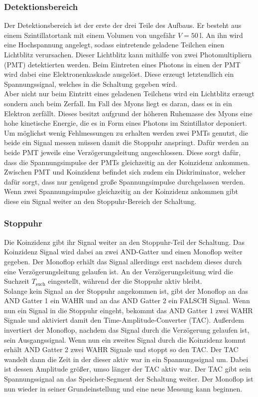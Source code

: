 \subsubsection{Detektionsbereich}
Der Detektionsbereich ist der erste der drei Teile des Aufbaus.
Er besteht aus einem Szintillatortank mit einem Volumen von ungefähr $V = \SI{50}{\litre}$.
An ihn wird eine Hochspannung angelegt, sodass eintretende geladene Teilchen einen Lichtblitz verursachen.
Dieser Lichtblitz kann mithilfe von zwei Photomultipliern (PMT) detektierten werden.
Beim Eintreten eines Photons in einen der PMT wird dabei eine Elektronenkaskade ausgelöst.
Diese erzeugt letztendlich ein Spannungssignal, welches in die Schaltung gegeben wird.\\
Aber nicht nur beim Eintritt eines geladenen Teilchens wird ein Lichtblitz erzeugt sondern auch beim Zerfall.
Im Fall des Myons liegt es daran, dass es in ein Elektron zerfällt.
Dieses besitzt aufgrund der höheren Ruhemasse des Myons eine hohe kinetische Energie, die es in Form eines Photons im Szintillator deponiert.\\
Um möglichst wenig Fehlmessungen zu erhalten werden zwei PMTs genutzt, die beide ein Signal messen müssen damit die Stoppuhr anspringt.
Dafür werden an beide PMT jeweils eine Verzögerungsleitung angeschlossen.
Diese sorgt dafür, dass die Spannungsimpulse der PMTs gleichzeitig an der Koinzidenz ankommen.
Zwischen PMT und Koinzidenz befindet sich zudem ein Diskriminator, welcher dafür sorgt, dass nur genügend große Spannungsimpulse durchgelassen werden.
Wenn zwei Spannungsimpulse gleichzeitig an der Koinzidenz ankommen gibt diese ein Signal weiter an den Stoppuhr-Bereich der Schaltung.
\subsubsection{Stoppuhr}
Die Koinzidenz gibt ihr Signal weiter an den Stoppuhr-Teil der Schaltung.
Das Koinzidenz Signal wird dabei an zwei AND-Gatter und einen Monoflop weiter gegeben.
Der Monoflop erhält das Signal allerdings erst nachdem dieses durch eine Verzögerungsleitung gelaufen ist.
An der Verzögerungsleitung wird die Suchzeit $T_\text{such}$ eingestellt, während der die Stoppuhr aktiv bleibt.\\
Solange kein Signal an der Stoppuhr angekommen ist, gibt der Monoflop an das AND Gatter 1 ein WAHR und an das AND Gatter 2 ein FALSCH Signal.
Wenn nun ein Signal in die Stoppuhr eingeht, bekommt das AND Gatter 1 zwei WAHR Signale und aktiviert damit den Time-Amplitude-Converter (TAC).
Außerdem invertiert der Monoflop, nachdem das Signal durch die Verzögerung gelaufen ist, sein Ausgangssignal.
Wenn nun ein zweites Signal durch die Koinzidenz kommt erhält AND Gatter 2 zwei WAHR Signale und stoppt so den TAC.
Der TAC wandelt dann die Zeit in der dieser aktiv war in ein Spannungssignal um.
Dabei ist dessen Amplitude größer, umso länger der TAC aktiv war.
Der TAC gibt sein Spannungssignal an das Speicher-Segment der Schaltung weiter.
Der Monoflop ist nun wieder in seiner Grundeinstellung und eine neue Messung kann beginnen.

